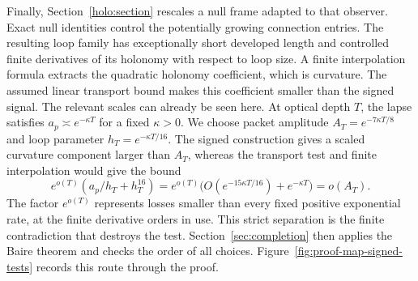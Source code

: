 Finally, Section~\ref{holo:section} rescales a null frame adapted to
that observer. Exact null identities control the potentially growing
connection entries. The resulting loop family has exceptionally short
developed length and controlled finite derivatives of its holonomy
with respect to loop size. A finite interpolation formula extracts
the quadratic holonomy coefficient, which is curvature. The assumed
linear transport bound makes this coefficient smaller than the signed
signal. The relevant scales can already be seen here. At optical depth
$T$, the lapse satisfies $a_p\asymp e^{-\kappa T}$ for a fixed
$\kappa>0$. We choose packet amplitude $A_T=e^{-7\kappa T/8}$
and loop parameter $h_T=e^{-\kappa T/16}$. The signed construction
gives a scaled curvature component larger than $A_T$, whereas the
transport test and finite interpolation would give the bound
\[
 e^{o(T)}(a_p/h_T+h_T^{16})
 =e^{o(T)}\bigl(O(e^{-15\kappa T/16})+e^{-\kappa T}\bigr)
 =o(A_T).
\]
The factor $e^{o(T)}$ represents losses smaller than every fixed
positive exponential rate, at the finite derivative orders in use.
This strict separation is the finite contradiction that destroys the test.
Section~\ref{sec:completion} then applies the Baire theorem and
checks the order of all choices. Figure~\ref{fig:proof-map-signed-tests}
records this route through the proof.


\FloatBarrier
